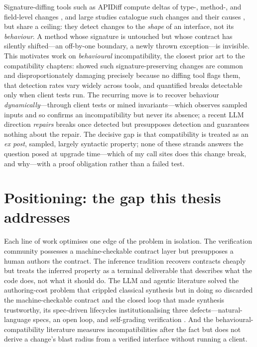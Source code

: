 Signature-diffing tools such as APIDiff compute deltas of type-, method-, and
field-level changes \cite{brito2018apidiff}, and large studies catalogue such
changes and their causes \cite{xavier2017historical,brito2018why}, but share a
ceiling: they detect changes to the \emph{shape} of an interface, not its
\emph{behaviour}. A method whose signature is untouched but whose contract has
silently shifted---an off-by-one boundary, a newly thrown exception---is invisible.
This motivates work on \emph{behavioural} incompatibility, the closest prior art to
the compatibility chapters: \citet{mostafa2017behavioral} showed such
signature-preserving changes are common and disproportionately damaging precisely
because no diffing tool flags them, \citet{jezek2017magic} that detection rates
vary widely across tools, and \citet{jayasuriya2024understanding} quantified breaks
detectable only when client tests run. The recurring move is to recover behaviour
\emph{dynamically}---through client tests or mined invariants---which observes
sampled inputs and so confirms an incompatibility but never its absence; a recent
LLM direction \emph{repairs} breaks once detected \cite{islam2025byam} but
presupposes detection and guarantees nothing about the repair. The decisive gap is
that compatibility is treated as an \emph{ex post}, sampled, largely syntactic
property; none of these strands answers the question posed at upgrade time---which
of my call sites does this change break, and why---with a proof obligation rather
than a failed test.

\section{Positioning: the gap this thesis addresses}\label{sec:bg-synthesis}

Each line of work optimises one edge of the problem in isolation. The verification
community possesses a machine-checkable contract layer \cite{cok2014openjml,leino2010dafny}
but presupposes a human authors the contract. The inference tradition recovers
contracts cheaply \cite{ernst2007daikon,flanagan2001houdini} but treats the
inferred property as a terminal deliverable that describes what the code does, not
what it should do. The LLM and agentic literature solved the authoring-cost problem
that crippled classical synthesis \cite{chen2021codex,yang2024sweagent} but in
doing so discarded the machine-checkable contract and the closed loop that made
synthesis trustworthy, its spec-driven lifecycles institutionalising three
defects---natural-language specs, an open loop, and self-grading verification
\cite{githubspeckit,awsaidlc,liu2026oracle}. And the behavioural-compatibility
literature measures incompatibilities after the fact
\cite{ochoa2022breaking,islam2025byam} but does not derive a change's blast radius
from a verified interface without running a client.

